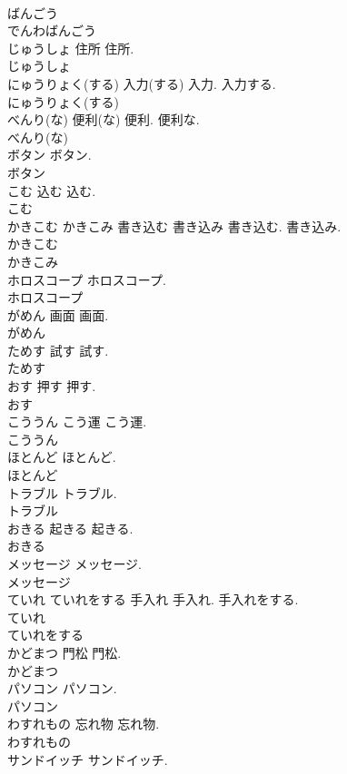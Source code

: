 \documentclass[8pt]{extreport}
\begin{document}
\begin{CJK}{UTF8}{min}
\\	ばんごう
\\	でんわばんごう
\\	じゅうしょ	住所	住所.	
\\	じゅうしょ
\\	にゅうりょく(する)	入力(する)	入力. 入力する.	
\\	にゅうりょく(する)
\\	べんり(な)	便利(な)	便利. 便利な.	
\\	べんり(な)
\\	ボタン		ボタン.	
\\	ボタン
\\	こむ	込む	込む.	
\\	こむ
\\	かきこむ かきこみ	書き込む 書き込み	書き込む. 書き込み.	
\\	かきこむ
\\	かきこみ
\\	ホロスコープ		ホロスコープ.	
\\	ホロスコープ
\\	がめん	画面	画面.
\\	がめん
\\	ためす	試す	試す.	
\\	ためす
\\	おす	押す	押す.	
\\	おす
\\	こううん	こう運	こう運.	
\\	こううん
\\	ほとんど		ほとんど.	
\\	ほとんど
\\	トラブル		トラブル.	
\\	トラブル
\\	おきる	起きる	起きる.	
\\	おきる
\\	メッセージ		メッセージ.	
\\	メッセージ
\\	ていれ ていれをする	手入れ	手入れ. 手入れをする.	
\\	ていれ
\\	ていれをする
\\	かどまつ	門松	門松.	
\\	かどまつ
\\	パソコン		パソコン.	
\\	パソコン
\\	わすれもの	忘れ物	忘れ物.	
\\	わすれもの
\\	サンドイッチ		サンドイッチ.	

\end{CJK}
\end{document}
